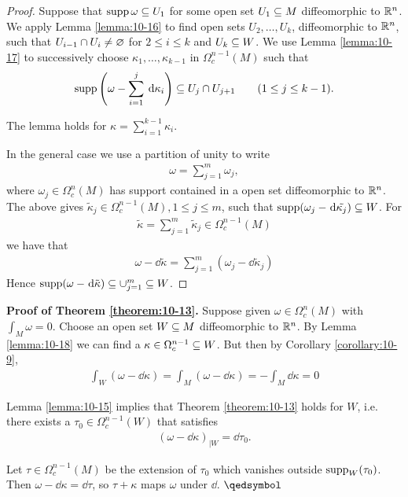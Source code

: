 \begin{proof}
  Suppose that $\operatorname{supp}\omega\subseteq U_1$ for some open set $U_1\subseteq M$ diffeomorphic to 
  ${\mathbb{R}}^n$. We apply Lemma \ref{lemma:10-16} to find open sets $U_2, \ldots, U_k$, diffeomorphic 
  to ${\mathbb{R}}^n$, such that $U_{i-1}\cap U_i\neq \varnothing$ for $2\le i\le k$ and $U_k\subseteq W$. We use Lemma 
  \ref{lemma:10-17} to successively choose $\kappa_1, \ldots, \kappa_{k-1}$ in $\Omega^{n-1}_c(M)$ such that 
  \begin{align*}
    \supp\left(\omega - \sum_{i=1}^{j }{\dd\kappa_i }\right)
    \sseq U_j\cap U_{j+1}\qquad (1\le j\le k-1).
  \end{align*}

  The lemma holds for $\kappa = \sum_{i=1}^{k-1}{\kappa_i}$.

  In the general case we use a partition of unity to write
  \begin{align*}
    \omega = \sum_{j = 1}^{m }{\omega_j},
  \end{align*}
  where $\omega_j\in\Omega^n_c(M)$ has support contained in a open set diffeomorphic to ${\mathbb{R}}^n$. 
  The above gives $\tilde{\kappa}_j\in\Omega^{n-1}_c(M), 1\le j\le m$, such that $\supp(\omega_j-\dd\tilde{\kappa_j})\sseq W$.
  For 
  \begin{align*}
    \tilde{\kappa} = \sum_{j=1}^{m }{\tilde{\kappa}_j} \in \Omega^{n-1}_c(M)
  \end{align*}
  we have that
  \begin{align*}
    \omega -\dd\tilde{\kappa} = \sum_{j=1}^{m }{(\omega_j - \dd\tilde{\kappa}_j)}
  \end{align*}
  Hence $\supp(\omega-\dd\tilde{\kappa})\sseq \cup_{j=1}^m\sseq W$.
\end{proof}

\textbf{Proof of Theorem \ref{theorem:10-13}.} Suppose given $\omega\in\Omega^n_c(M)$ with 
$\int_M\omega = 0$. Choose an open set $W\subseteq M$ diffeomorphic to ${\mathbb{R}}^n$. By Lemma \ref{lemma:10-18}
we can find a $\kappa\in\Omega_c^{n-1}\subseteq W$. But then by Corollary \ref{corollary:10-9},
\begin{align*}
  \int_W (\omega - \dd\kappa) 
  = \int_M (\omega - \dd\kappa)
  = - \int_M\dd\kappa 
  = 0
\end{align*}

Lemma \ref{lemma:10-15} implies that Theorem \ref{theorem:10-13} holds for $W$, i.e. there 
exists a $\tau_0\in\Omega^{n-1}_c(W)$ that satisfies
\begin{align*}
  (\omega - \dd\kappa)_{|W} = \dd\tau_0.
\end{align*}

Let $\tau\in \Omega^{n-1}_c(M)$ be the extension of $\tau_0$ which vanishes outside $\operatorname{supp}_W(\tau_0)$.
Then $\omega -\dd\kappa=\dd\tau$, so $\tau+\kappa$ maps $\omega$ under $\dd$. \hfill\(\qedsymbol\)
